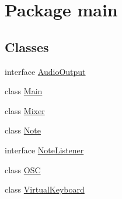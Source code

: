 \hypertarget{namespacemain}{}\section{Package main}
\label{namespacemain}
\subsection*{Classes}
\begin{DoxyCompactItemize}
\item 
interface \hyperlink{interfacemain_1_1_audio_output}{Audio\+Output}
\item 
class \hyperlink{classmain_1_1_main}{Main}
\item 
class \hyperlink{classmain_1_1_mixer}{Mixer}
\item 
class \hyperlink{classmain_1_1_note}{Note}
\item 
interface \hyperlink{interfacemain_1_1_note_listener}{Note\+Listener}
\item 
class \hyperlink{classmain_1_1_o_s_c}{O\+SC}
\item 
class \hyperlink{classmain_1_1_virtual_keyboard}{Virtual\+Keyboard}
\end{DoxyCompactItemize}
